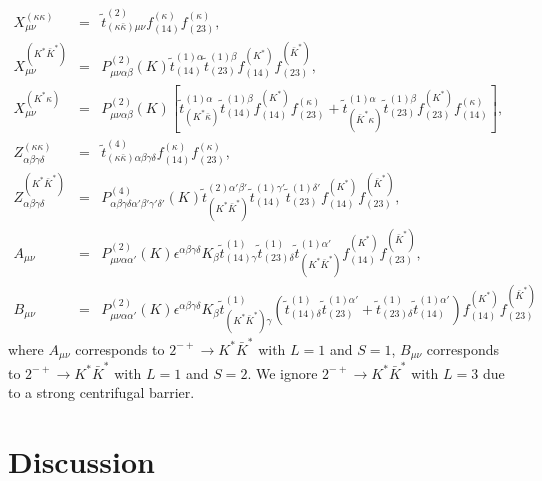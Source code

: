 \begin{eqnarray}
X_{\mu\nu}^{(\kappa\kappa)}\!&=&\! \tilde
t^{(2)}_{(\kappa\bar\kappa)\mu\nu}
f_{(14)}^{(\kappa)}f_{(23)}^{(\kappa)},\\
X_{\mu\nu}^{(K^*\bar K^*)}    \!&=&\!
P^{(2)}_{\mu\nu\alpha\beta}(K)\tilde t^{(1)\alpha}_{(14)} \tilde
t^{(1)\beta}_{(23)}  f_{(14)}^{(K^*)}f_{(23)}^{(\bar K^*)}, \\
X_{\mu\nu}^{(K^*\kappa)}    \!&=&\! P^{(2)}_{\mu\nu\alpha\beta}(K)
[\tilde t^{(1)\alpha}_{(K^*\bar\kappa)}\tilde t^{(1)\beta}_{(14)}
f_{(14)}^{(K^*)}f_{(23)}^{(\kappa)}+\tilde t^{(1)\alpha}_{(\bar
K^*\kappa)}\tilde
t^{(1)\beta}_{(23)}f_{(23)}^{(K^*)}f_{(14)}^{(\kappa)}], \\
Z^{(\kappa\kappa)}_{\alpha\beta\gamma\delta} \!&=&\! \tilde
t^{(4)}_{(\kappa\bar\kappa)\alpha\beta\gamma\delta}
f_{(14)}^{(\kappa)}f_{(23)}^{(\kappa)}, \\
Z^{(K^*\bar K^*)}_{\alpha\beta\gamma\delta} \!&=&\!
P^{(4)}_{\alpha\beta\gamma\delta\alpha'\beta'\gamma'\delta'}(K)
\tilde t^{(2)\alpha'\beta'}_{(K^*\bar K^*)}
                \tilde{t}^{(1)\gamma'}_{(14)}\tilde{t}^{(1)\delta'}_{(23)}
                f_{(14)}^{(K^*)}f_{(23)}^{(\bar K^*)}, \\
A_{\mu\nu} \!&=&\! P^{(2)}_{\mu\nu\alpha\alpha'}(K)
\epsilon^{\alpha\beta\gamma\delta} K_{\beta}
\tilde{t}^{(1)}_{(14)\gamma}\tilde{t}^{(1)}_{(23)\delta} \tilde
t^{(1)\alpha'}_{(K^*\bar K^*)}
                f_{(14)}^{(K^*)}f_{(23)}^{(\bar K^*)},\\
B_{\mu\nu} \!&=&\! P^{(2)}_{\mu\nu\alpha\alpha'}(K)
\epsilon^{\alpha\beta\gamma\delta} K_{\beta} \tilde
t^{(1)}_{(K^*\bar K^*)\gamma}
(\tilde{t}^{(1)}_{(14)\delta}\tilde{t}_{(23)}^{(1)\alpha'}
+\tilde{t}^{(1)}_{(23)\delta}\tilde{t}_{(14)}^{(1)\alpha'})
f_{(14)}^{(K^*)}f_{(23)}^{(\bar K^*)}
\end{eqnarray}
where $A_{\mu\nu}$ corresponds to $2^{-+}\to K^*\bar K^*$ with
$L=1$ and $S=1$, $B_{\mu\nu}$ corresponds to $2^{-+}\to K^*\bar
K^*$ with $L=1$ and $S=2$. We ignore $2^{-+}\to K^*\bar K^*$ with
$L=3$ due to a strong centrifugal barrier.

\section{Discussion}

